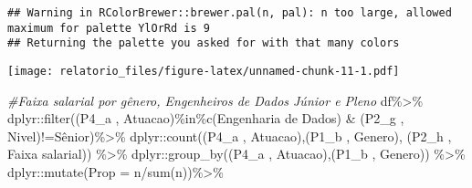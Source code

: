 \documentclass[
]{article}
\newenvironment{Shaded}{\begin{snugshade}}{\end{snugshade}}
\newcommand{\AttributeTok}[1]{\textcolor[rgb]{0.77,0.63,0.00}{#1}}
\newcommand{\CommentTok}[1]{\textcolor[rgb]{0.56,0.35,0.01}{\textit{#1}}}
\newcommand{\FunctionTok}[1]{\textcolor[rgb]{0.00,0.00,0.00}{#1}}
\newcommand{\NormalTok}[1]{#1}
\newcommand{\SpecialCharTok}[1]{\textcolor[rgb]{0.00,0.00,0.00}{#1}}
\newcommand{\StringTok}[1]{\textcolor[rgb]{0.31,0.60,0.02}{#1}}
\begin{document}
\begin{verbatim}
## Warning in RColorBrewer::brewer.pal(n, pal): n too large, allowed maximum for palette YlOrRd is 9
## Returning the palette you asked for with that many colors
\end{verbatim}

\texttt{[image: relatorio\_files/figure-latex/unnamed-chunk-11-1.pdf]}

\begin{Shaded}
\begin{Highlighting}[]
\CommentTok{\#Faixa salarial por gênero, Engenheiros de Dados Júnior e Pleno}
\NormalTok{df}\SpecialCharTok{\%\textgreater{}\%}
\NormalTok{  dplyr}\SpecialCharTok{::}\FunctionTok{filter}\NormalTok{(}\StringTok{\textasciigrave{}}\AttributeTok{(\textquotesingle{}P4\_a \textquotesingle{}, \textquotesingle{}Atuacao\textquotesingle{})}\StringTok{\textasciigrave{}}\SpecialCharTok{\%in\%}\FunctionTok{c}\NormalTok{(}\StringTok{\textquotesingle{}Engenharia de Dados\textquotesingle{}}\NormalTok{) }\SpecialCharTok{\&}
                  \StringTok{\textasciigrave{}}\AttributeTok{(\textquotesingle{}P2\_g \textquotesingle{}, \textquotesingle{}Nivel\textquotesingle{})}\StringTok{\textasciigrave{}}\SpecialCharTok{!=}\StringTok{\textquotesingle{}Sênior\textquotesingle{}}\NormalTok{)}\SpecialCharTok{\%\textgreater{}\%}
\NormalTok{  dplyr}\SpecialCharTok{::}\FunctionTok{count}\NormalTok{(}\StringTok{\textasciigrave{}}\AttributeTok{(\textquotesingle{}P4\_a \textquotesingle{}, \textquotesingle{}Atuacao\textquotesingle{})}\StringTok{\textasciigrave{}}\NormalTok{,}\StringTok{\textasciigrave{}}\AttributeTok{(\textquotesingle{}P1\_b \textquotesingle{}, \textquotesingle{}Genero\textquotesingle{})}\StringTok{\textasciigrave{}}\NormalTok{, }\StringTok{\textasciigrave{}}\AttributeTok{(\textquotesingle{}P2\_h \textquotesingle{}, \textquotesingle{}Faixa salarial\textquotesingle{})}\StringTok{\textasciigrave{}}\NormalTok{) }\SpecialCharTok{\%\textgreater{}\%}
\NormalTok{  dplyr}\SpecialCharTok{::}\FunctionTok{group\_by}\NormalTok{(}\StringTok{\textasciigrave{}}\AttributeTok{(\textquotesingle{}P4\_a \textquotesingle{}, \textquotesingle{}Atuacao\textquotesingle{})}\StringTok{\textasciigrave{}}\NormalTok{,}\StringTok{\textasciigrave{}}\AttributeTok{(\textquotesingle{}P1\_b \textquotesingle{}, \textquotesingle{}Genero\textquotesingle{})}\StringTok{\textasciigrave{}}\NormalTok{) }\SpecialCharTok{\%\textgreater{}\%}
\NormalTok{  dplyr}\SpecialCharTok{::}\FunctionTok{mutate}\NormalTok{(}\AttributeTok{Prop =}\NormalTok{ n}\SpecialCharTok{/}\FunctionTok{sum}\NormalTok{(n))}\SpecialCharTok{\%\textgreater{}\%}

\end{Highlighting}
\end{Shaded}
\end{document}
